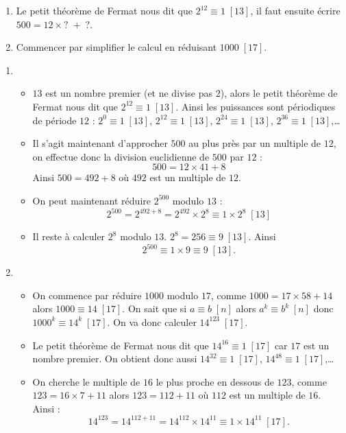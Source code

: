 \documentclass[11pt,class=report,crop=false]{standalone}
\begin{document}
\indication
\sauteligne
\begin{enumerate}
    \item Le petit théorème de Fermat nous dit que $2^{12} \equiv 1 \; [13]$, il faut ensuite écrire $500 = 12 \times ? \;  + \; ?$.
    \item Commencer par simplifier le calcul en réduisant $1000 \; [17]$.
\end{enumerate}     
\finindication

\correction
\sauteligne
\begin{enumerate}
    \item 
    \begin{itemize}
       \item $13$ est un nombre premier (et ne divise pas $2$), alors le petit théorème de Fermat nous dit que $2^{12} \equiv 1 \; [13]$. Ainsi les puissances sont périodiques de période $12$ :
       $2^0 \equiv 1 \; [13]$,  $2^{12} \equiv 1 \; [13]$, $2^{24} \equiv 1 \; [13]$, $2^{36} \equiv 1 \; [13]$,\ldots
       \item Il s'agit maintenant d'approcher $500$ au plus près par un multiple de $12$, on effectue donc la division euclidienne de $500$ par $12$ :
       $$500 = 12 \times 41 + 8$$
       Ainsi $500 = 492 +8$ où $492$ est un multiple de $12$.
       \item On peut maintenant réduire $2^{500}$ modulo $13$ :
       $$2^{500} = 2^{492 + 8} = 2^{492} \times 2^8  \equiv 1 \times 2^8 \; [13]$$
       \item Il reste à calculer $2^8$ modulo $13$.
       $2^8 = 256 \equiv 9 \; [13]$.
       Ainsi $$2^{500} \equiv 1 \times 9 \equiv 9 \; [13].$$
   \end{itemize}
   
       
    \item 
    \begin{itemize}
      \item On commence par réduire $1000$ modulo $17$, comme $1000 = 17\times 58 +14$ alors $1000 \equiv 14 \; [17]$. On sait que si $a\equiv b \; [n]$ alors $a^k \equiv b^k \; [n]$ donc $1000^k \equiv 14^k \; [17]$. On va donc calculer $14^{123} \; [17]$.
          
      \item Le petit théorème de Fermat nous dit que $14^{16} \equiv 1 \; [17]$ car $17$ est un nombre premier. On obtient donc aussi $14^{32} \equiv 1 \; [17]$, $14^{48} \equiv 1 \; [17]$,\ldots
      
      \item On cherche le multiple de $16$ le plus proche en dessous de $123$, comme $123=16 \times 7+11$ alors
      $123 = 112 + 11$ où $112$ est un multiple de $16$. Ainsi :
      $$14^{123} = 14^{112 + 11} = 14^{112} \times 14^{11} \equiv 1 \times 14^{11} \; [17].$$
      

\end{itemize}
\end{enumerate}
\end{document}
